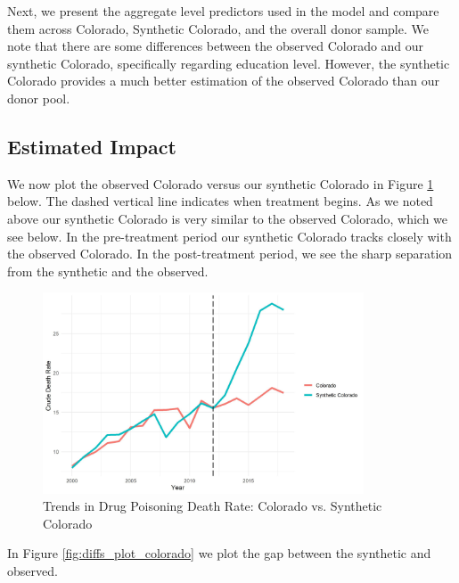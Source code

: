 \documentclass{article}
\begin{document}


Next, we present the aggregate level predictors used in the model and compare them across Colorado, Synthetic Colorado, and the overall donor sample. We note that there are some differences between the observed Colorado and our synthetic Colorado, specifically regarding education level. However, the synthetic Colorado provides a much better estimation of the observed Colorado than our donor pool. 



\subsection{Estimated Impact}

We now plot the observed Colorado versus our synthetic Colorado in Figure \ref{fig:trends_plot_colorado} below. The dashed vertical line indicates when treatment begins. As we noted above our synthetic Colorado is very similar to the observed Colorado, which we see below. In the pre-treatment period our synthetic Colorado tracks closely with the observed Colorado. In the post-treatment period, we see the sharp separation from the synthetic and the observed. 

\begin{figure}[H]
	\begin{center}
		\includegraphics[width=0.85\textwidth]{trends_plot_colorado}
	\end{center}
	\caption{Trends in Drug Poisoning Death Rate: Colorado vs. Synthetic Colorado}
	\label{fig:trends_plot_colorado}
\end{figure}

In Figure \ref{fig:diffs_plot_colorado} we plot the gap between the synthetic and observed.
\end{document}
